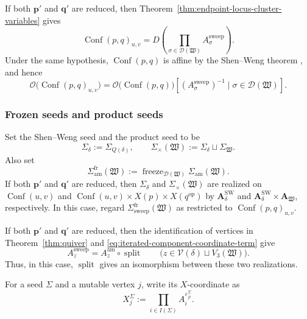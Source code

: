 \documentclass[10pt,a4paper]{article}
\theoremstyle{definition}
\theoremstyle{remark}
\newcommand{\Conf}{\operatorname{Conf}}
\newcommand{\Dcal}{\mathcal D}
\newcommand{\Vcal}{\mathcal V}
\newcommand{\eps}{\varepsilon}
\newcommand{\fW}{\mathfrak W}
\newcommand{\Split}{\operatorname{split}}
\begin{document}
If both \(\mathbf p'\) and \(\mathbf q'\) are reduced, then
Theorem~\ref{thm:endpoint-locus-cluster-variables} gives
\begin{equation}
 \Conf(p,q)_{u,v}
 =D\left(\prod_{\sigma\in\Dcal(\fW)}A_\sigma^{\mathrm{sweep}}\right).
 \label{eq:endpoint-term-product}
\end{equation}
Under the same hypothesis, \(\Conf(p,q)\) is affine by the Shen--Weng theorem
\cite[Theorem~2.30]{ShenWeng2021}, and hence
\begin{equation}
 \mathcal O\bigl(\Conf(p,q)_{u,v}\bigr)
 =\mathcal O\bigl(\Conf(p,q)\bigr)
  \left[(A_\sigma^{\mathrm{sweep}})^{-1}
        \mid\sigma\in\Dcal(\fW)\right].
 \label{eq:endpoint-term-localization}
\end{equation}

\subsubsection{Frozen seeds and product seeds}

Set the Shen--Weng seed and the product seed to be
\[
 \Sigma_\delta:=\Sigma_{Q(\delta)},
 \qquad
 \Sigma_\times(\fW):=\Sigma_\delta\sqcup\Sigma_\fW.
\]
Also set
\begin{equation}
 \Sigma_{\mathrm{am}}^{\mathrm{fr}}(\fW)
 :=\operatorname{freeze}_{\Dcal(\fW)}
    \Sigma_{\mathrm{am}}(\fW).
 \label{eq:def-frozen-amalgamation-seed}
\end{equation}
If both \(\mathbf p'\) and \(\mathbf q'\) are reduced, then
\(\Sigma_\delta\) and \(\Sigma_\times(\fW)\) are realized on \(\Conf(u,v)\)
and \(\Conf(u,v)\times X(p)\times X(q^{\mathrm{op}})\) by
\(\mathbf A_\delta^{\mathrm{SW}}\) and
\(\mathbf A_\delta^{\mathrm{SW}}\times\mathbf A_\fW\), respectively.  In this
case, regard \(\Sigma_{\mathrm{sweep}}^{\mathrm{fr}}(\fW)\) as restricted to
\(\Conf(p,q)_{u,v}\).

If both \(\mathbf p'\) and \(\mathbf q'\) are reduced, then the identification
of vertices in Theorem~\ref{thm:quiver} and
\eqref{eq:iterated-component-coordinate-term} give
\begin{equation}
 A_z^{\mathrm{sweep}}=A_z^{\mathrm{am}}\circ\Split
 \qquad\bigl(z\in\Vcal(\delta)\sqcup V_3(\fW)\bigr).
 \label{eq:full-frozen-exact-seed}
\end{equation}
Thus, in this case, \(\Split\) gives an isomorphism between these two
realizations.

For a seed \(\Sigma\) and a mutable vertex \(j\), write its \(X\)-coordinate
as
\[
 X_j^\Sigma
 :=\prod_{i\in I(\Sigma)}A_i^{\eps^\Sigma_{ji}}.
\]
\end{document}
